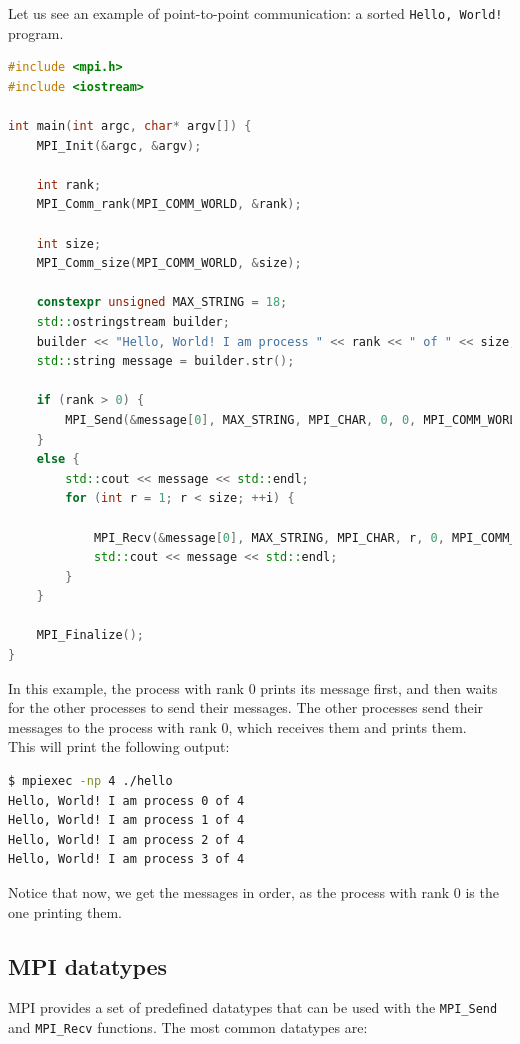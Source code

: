 Let us see an example of point-to-point communication: a sorted \texttt{Hello, World!} 
program.

\begin{lstlisting}[language=C++]
#include <mpi.h>
#include <iostream>

int main(int argc, char* argv[]) {
    MPI_Init(&argc, &argv);

    int rank;
    MPI_Comm_rank(MPI_COMM_WORLD, &rank);

    int size;
    MPI_Comm_size(MPI_COMM_WORLD, &size);

    constexpr unsigned MAX_STRING = 18;
    std::ostringstream builder;
    builder << "Hello, World! I am process " << rank << " of " << size;
    std::string message = builder.str();

    if (rank > 0) {
        MPI_Send(&message[0], MAX_STRING, MPI_CHAR, 0, 0, MPI_COMM_WORLD);
    }
    else {
        std::cout << message << std::endl;
        for (int r = 1; r < size; ++i) {
            
            MPI_Recv(&message[0], MAX_STRING, MPI_CHAR, r, 0, MPI_COMM_WORLD, MPI_STATUS_IGNORE);
            std::cout << message << std::endl;
        }
    }

    MPI_Finalize();
}
\end{lstlisting}

\vspace{1em}

In this example, the process with rank 0 prints its message first, and then waits for the
other processes to send their messages. The other processes send their messages to the
process with rank 0, which receives them and prints them.\\

This will print the following output:

\begin{lstlisting}[language=bash]
$ mpiexec -np 4 ./hello
Hello, World! I am process 0 of 4
Hello, World! I am process 1 of 4
Hello, World! I am process 2 of 4
Hello, World! I am process 3 of 4
\end{lstlisting}

Notice that now, we get the messages in order, as the process with rank 0 is the one
printing them.

\subsection{MPI datatypes}

MPI provides a set of predefined datatypes that can be used with the \texttt{MPI\_Send}
and \texttt{MPI\_Recv} functions. The most common datatypes are:

